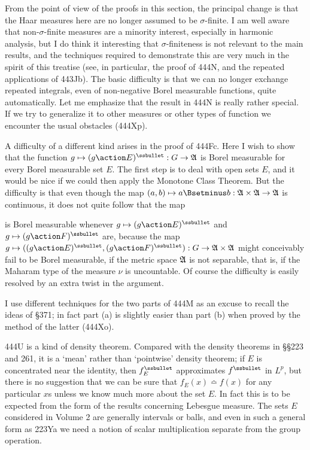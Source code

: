 {From the point of view of the proofs in this section, the principal
change is that the Haar measures here are no longer assumed to be
$\sigma$-finite.   I am well aware that non-$\sigma$-finite measures are
a minority interest, especially in harmonic analysis, but I do think it
interesting that $\sigma$-finiteness is not relevant to the main
results, and the techniques required to demonstrate this are very much
in the spirit of this treatise (see, in particular, the proof of 444N,
and the repeated applications of 443Jb).
The basic difficulty is that we can no longer exchange repeated
integrals, even of non-negative Borel measurable functions, quite
automatically.   Let me emphasize that the result in 444N is really
rather special.   If we try to generalize it to other measures or other
types of function we encounter the usual obstacles (444Xp).

A difficulty of a different kind arises in the proof of 444Fc.   Here I
wish to show that the function
$g\mapsto(g\action E)^{\ssbullet}:G\to\frak A$ is Borel measurable for
every Borel
measurable set $E$.   The first step is to deal with open sets $E$, and
it would be nice if we could then apply the Monotone Class Theorem.
But the difficulty is that even though the map
$(a,b)\mapsto a\Bsetminus b:\frak A\times\frak A\to\frak A$ is
continuous, it does not quite follow that the map


\noindent is Borel measurable whenever
$g\mapsto(g\action E)^{\ssbullet}$ and
$g\mapsto(g\action F)^{\ssbullet}$ are, because the map
$g\mapsto((g\action E)^{\ssbullet},(g\action F)^{\ssbullet}):
G\to\frak A\times\frak A$ might conceivably fail to be Borel measurable,
if the metric space $\frak A$ is not separable, that is, if the Maharam
type of the measure $\nu$ is uncountable.   Of course the difficulty is
easily resolved by an extra twist in the argument.

I use different techniques for the two parts of 444M as an excuse to
recall the ideas of \S371;  in fact part (a) is slightly easier than
part (b) when proved by the method of the latter (444Xo).

444U is a kind of density theorem.   Compared with the density theorems
in \S\S223 and 261, it is a `mean' rather than `pointwise' density
theorem;  if $E$ is concentrated near the identity, then
$f_E^{\ssbullet}$ approximates $f^{\ssbullet}$ in $L^p$, but there is no
suggestion that we can be sure that $f_E(x)\bumpeq f(x)$ for any
particular $x$s unless we know much more about the set $E$.   In fact
this is to be expected from the form of the results concerning Lebesgue
measure.   The sets $E$ considered in Volume 2 are generally intervals or
balls, and even in such a general form as 223Ya we need a notion of
scalar multiplication separate from the group operation.
}%

\discrpage

